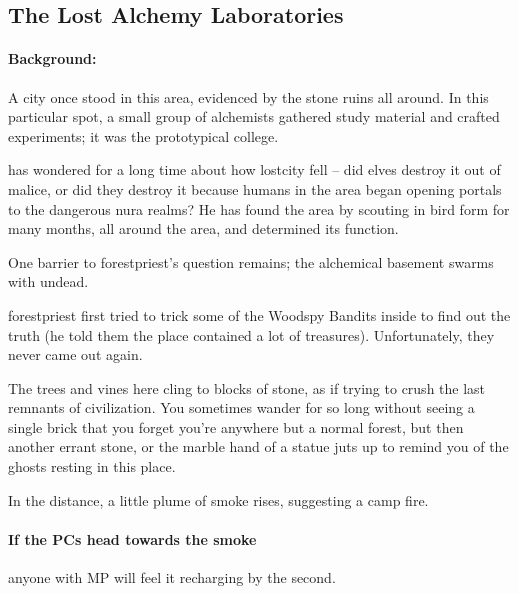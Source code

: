 \begin{multicols}{2}
\begin{itemize}
\end{itemize}

\subsection{The Lost Alchemy Laboratories}
\label{lostcity}

\paragraph{Background:}
A city once stood in this area, evidenced by the stone ruins all around.
In this particular spot, a small group of alchemists gathered study material and crafted experiments; it was the prototypical \gls{college}.

 has wondered for a long time about how \gls{lostcity} fell -- did elves destroy it out of malice, or did they destroy it because humans in the area began opening portals to the dangerous nura realms?
He has found the area by scouting in bird form for many months, all around the area, and determined its function.

One barrier to \gls{forestpriest}'s question remains; the alchemical basement swarms with undead.

\Gls{forestpriest} first tried to trick some of the Woodspy Bandits inside to find out the truth (he told them the place contained a lot of treasures).
Unfortunately, they never came out again.

\begin{boxtext}

  The trees and vines here cling to blocks of stone, as if trying to crush the last remnants of civilization.
  You sometimes wander for so long without seeing a single brick that you forget you're anywhere but a normal forest, but then another errant stone, or the marble hand of a statue juts up to remind you of the ghosts resting in this place.

  In the distance, a little plume of smoke rises, suggesting a camp fire.

\end{boxtext}

\paragraph{If the PCs head towards the smoke}
anyone with MP will feel it recharging by the second.


\end{multicols}
